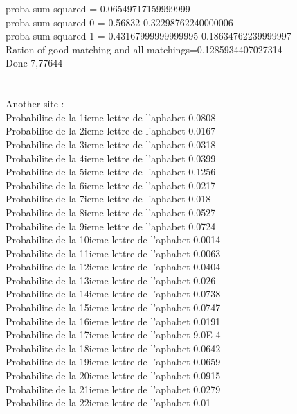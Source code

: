 \documentclass{article}
\begin{document}
{proba sum squared = 0.06549717159999999\\
proba sum squared 0 = 0.56832 0.32298762240000006\\
proba sum squared 1 = 0.43167999999999995 0.18634762239999997\\
Ration of good matching and all matchings=0.1285934407027314\\
Donc 7,77644
\\
\\
\\
Another site :\\
Probabilite de la 1ieme lettre de l'aphabet 0.0808\\
Probabilite de la 2ieme lettre de l'aphabet 0.0167\\
Probabilite de la 3ieme lettre de l'aphabet 0.0318\\
Probabilite de la 4ieme lettre de l'aphabet 0.0399\\
Probabilite de la 5ieme lettre de l'aphabet 0.1256\\
Probabilite de la 6ieme lettre de l'aphabet 0.0217\\
Probabilite de la 7ieme lettre de l'aphabet 0.018\\
Probabilite de la 8ieme lettre de l'aphabet 0.0527\\
Probabilite de la 9ieme lettre de l'aphabet 0.0724\\
Probabilite de la 10ieme lettre de l'aphabet 0.0014\\
Probabilite de la 11ieme lettre de l'aphabet 0.0063\\
Probabilite de la 12ieme lettre de l'aphabet 0.0404\\
Probabilite de la 13ieme lettre de l'aphabet 0.026\\
Probabilite de la 14ieme lettre de l'aphabet 0.0738\\
Probabilite de la 15ieme lettre de l'aphabet 0.0747\\
Probabilite de la 16ieme lettre de l'aphabet 0.0191\\
Probabilite de la 17ieme lettre de l'aphabet 9.0E-4\\
Probabilite de la 18ieme lettre de l'aphabet 0.0642\\
Probabilite de la 19ieme lettre de l'aphabet 0.0659\\
Probabilite de la 20ieme lettre de l'aphabet 0.0915\\
Probabilite de la 21ieme lettre de l'aphabet 0.0279\\
Probabilite de la 22ieme lettre de l'aphabet 0.01\\
}
\end{document}
